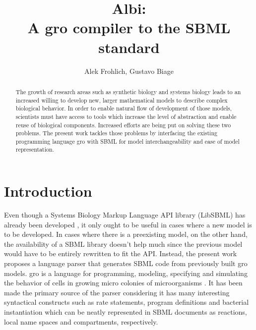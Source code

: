 \documentclass[12pt]{article}
\title{Albi:\\ A gro compiler to the SBML standard}
\author{Alek Frohlich\inst{1}, Gustavo Biage\inst{1}}
\begin{document}
\maketitle

\begin{abstract}


    The growth of research areas such as synthetic biology and systems biology leads to an increased willing to develop new, larger mathematical models to describe complex biological behavior. In order to enable natural flow of development of those models, scientists must have access to tools which increase the level of abstraction and enable reuse of biological components. Increased efforts are being put on solving these two problems. The present work tackles those problems by interfacing the existing programming language gro with SBML for model interchangeability and ease of model representation.


\end{abstract}

\section{Introduction}


    Even though a Systems Biology Markup Language API library (LibSBML) has already been developed 
    \cite{Bornstein2008}, it only ought to be useful in cases where a new model is to be developed. In cases where 
    there is a preexisting model, on the other hand, the availability of a SBML library doesn't help much since the 
    previous model would have to be entirely rewritten to fit the API. Instead, the present work proposes a language 
    parser that generates SBML code from previously built gro models. gro is a language for programming, modeling, 
    specifying and simulating the behavior of cells in growing micro colonies of microorganisms \cite{Jang2012}. It 
    has been made the primary source of the parser considering it has many interesting syntactical constructs such as
    rate statements, program definitions and bacterial instantiation which can be neatly represented in SBML  
    documents as reactions, local name spaces and compartments, respectively.
    
\end{document}
